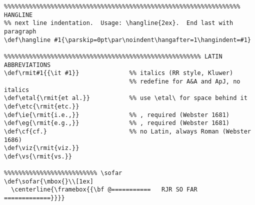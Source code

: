 {\begin{verbatim}
%%%%%%%%%%%%%%%%%%%%%%%%%%%%%%%%%%%%%%%%%%%%%%%%%%%%%%%%%%%%%%%%%% HANGLINE
%% next line indentation.  Usage: \hangline{2ex}.  End last with paragraph
\def\hangline #1{\parskip=0pt\par\noindent\hangafter=1\hangindent=#1}

%%%%%%%%%%%%%%%%%%%%%%%%%%%%%%%%%%%%%%%%%%%%%%%%%%%%%%% LATIN ABBREVIATIONS
\def\rmit#1{{\it #1}}              %% italics (RR style, Kluwer)
                                   %% redefine for A&A and ApJ, no italics
\def\etal{\rmit{et al.}}           %% use \etal\ for space behind it        
\def\etc{\rmit{etc.}}           
\def\ie{\rmit{i.e.,}}              %% , required (Webster 1681)
\def\eg{\rmit{e.g.,}}              %% , required (Webster 1681)
\def\cf{cf.}                       %% no Latin, always Roman (Webster 1686)
\def\viz{\rmit{viz.}}
\def\vs{\rmit{vs.}}

%%%%%%%%%%%%%%%%%%%%%%%%%% \sofar
\def\sofar{\mbox{}\\[1ex]
  \centerline{\framebox{{\bf @===========   RJR SO FAR   =============}}}}


\end{verbatim}}
